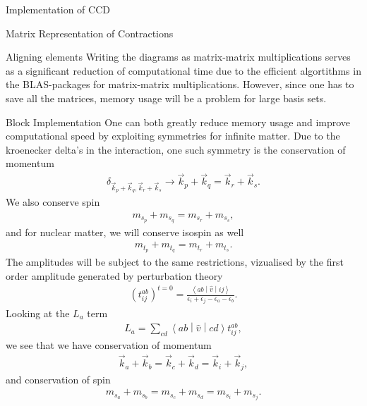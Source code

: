 \documentclass[twoside,english]{uiofysmaster}
\begin{document}
\begin{chapter}{Implementation of CCD}
\begin{section}{Matrix Representation of Contractions}
\begin{subsection}{Aligning elements}
			Writing the diagrams as matrix-matrix
                        multiplications serves as a significant
                        reduction of computational time  due to the
                        efficient algortithms in the BLAS-packages for
                        matrix-matrix multiplications. However, since
                        one has to save all the matrices, memory usage
                        will be a problem for large basis sets.
		\end{subsection}

	\end{section}

	\begin{section}{Block Implementation}
		One can both greatly reduce memory usage and improve
                computational speed by exploiting symmetries for
                infinite matter. Due to the kroenecker delta's in the
                interaction, one such symmetry is the conservation of
                momentum
		\begin{align}
			\delta_{\vec k_p + \vec k_q, \vec k_r + \vec k_s} \rightarrow \vec k_p + \vec k_q = \vec k_r + \vec k_s.
		\end{align}
		We also conserve spin 
		\begin{align}
			m_{s_p} + m_{s_q} = m_{s_r} + m_{s_s},
		\end{align}
		and for nuclear matter, we will conserve isospin as well
		\begin{align}
			m_{t_p} + m_{t_q} = m_{t_r} + m_{t_s}.
		\end{align}
		The amplitudes will be subject to the same
                restrictions, vizualised by the first order amplitude
                generated by perturbation theory
		\begin{align}
			(t_{ij}^{ab})^{t=0} = \frac{\left<ab\middle|\hat v\middle|ij\right>}{\epsilon_i + \epsilon_j - \epsilon_a - \epsilon_b}.
		\end{align}
		Looking at the $L_a$ term
		\begin{align}
			L_a = \sum_{cd} \left<ab\middle|\hat v\middle|cd\right> t_{ij}^{ab},
		\end{align}
		we see that we have conservation of momentum
		\begin{align}
			\vec k_a + \vec k_b = \vec k_c + \vec k_d = \vec k_i + \vec k_j,
		\end{align}
		and conservation of spin
		\begin{align}
			m_{s_a} + m_{s_b} = m_{s_c} + m_{s_d} = m_{s_i} + m_{s_j} .
		\end{align}

\end{section}
\end{chapter}
\end{document}
